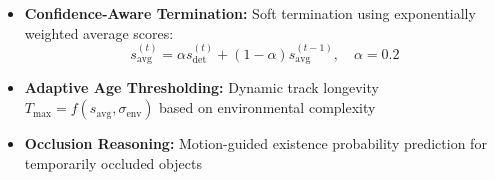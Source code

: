 \begin{itemize}
\item \textbf{Confidence-Aware Termination:} Soft termination using exponentially weighted average scores:
\begin{equation}
s_{\mathrm{avg}}^{(t)} = \alpha s_{\mathrm{det}}^{(t)} + (1-\alpha)s_{\mathrm{avg}}^{(t-1)}, \quad \alpha=0.2
\end{equation}

\item \textbf{Adaptive Age Thresholding:} Dynamic track longevity $T_{\mathrm{max}} = f(s_{\mathrm{avg}}, \sigma_{\mathrm{env}})$ based on environmental complexity

\item \textbf{Occlusion Reasoning:} Motion-guided existence probability prediction for temporarily occluded objects
\end{itemize}






